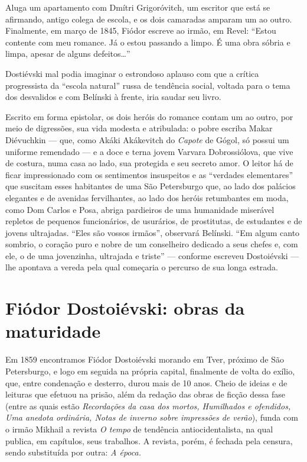 Aluga um apartamento com Dmítri Grigoróvitch, um escritor que
está se afirmando, antigo colega de escola, e os dois camaradas
amparam um ao outro. Finalmente, em março de 1845, Fiódor escreve ao irmão, em
Revel: ``Estou contente com meu romance. Já o estou passando a limpo.
É uma obra sóbria e limpa, apesar de alguns defeitos\ldots{}''

Dostiévski mal podia imaginar o estrondoso aplauso com que a
crítica progressista da ``escola natural'' russa de tendência
social, voltada para o tema dos desvalidos e com Belínski à
frente, iria saudar seu livro.

Escrito em forma epistolar, os dois heróis do romance contam um
ao outro, por meio de digressões, sua vida modesta e atribulada:
o pobre escriba Makar Diévuchkin --- que, como Akáki Akákevitch do
\emph{Capote} de Gógol, só possui um uniforme remendado --- e a
doce e terna jovem Varvara Dobrossiólova, que vive de costura,
numa casa ao lado, sua protegida e seu secreto amor. O
leitor há de ficar impressionado com os sentimentos insuspeitos
e as ``verdades elementares'' que suscitam esses habitantes de
uma São Petersburgo que, ao lado dos palácios elegantes e de
avenidas fervilhantes, ao lado dos heróis retumbantes em moda,
como Dom Carlos e Posa, abriga pardieiros de uma humanidade
miserável repletos de pequenos funcionários, de usurários, de
prostitutas, de estudantes e de jovens ultrajadas. ``Eles são
vossos irmãos'', observará Belínski. ``Em algum canto sombrio,
o coração puro e nobre de um conselheiro dedicado a seus chefes
e, com ele, o de uma jovenzinha, ultrajada e triste'' ---
conforme escreveu Dostoiévski --- lhe apontava a vereda pela
qual começaria o percurso de sua longa estrada.


\section{Fiódor Dostoiévski: obras da maturidade}


Em 1859 encontramos Fiódor Dostoiévski morando em Tver, próximo
de São Petersburgo, e logo em seguida na própria capital,
finalmente de volta do exílio, que, entre condenação e desterro,
durou mais de 10 anos. Cheio de ideias e de leituras que efetuou
na prisão, além da redação das obras de ficção dessa fase (entre
as quais estão \emph{Recordações da casa dos mortos, Humilhados
e ofendidos, Uma anedota ordinária, Notas de inverno sobre
impressões de verão}), funda com o irmão Mikhail a revista
\emph{O tempo} de tendência antiocidentalista, na qual publica,
em capítulos, seus trabalhos. A revista, porém, é fechada pela
censura, sendo substituída por outra: \emph{A época.}

